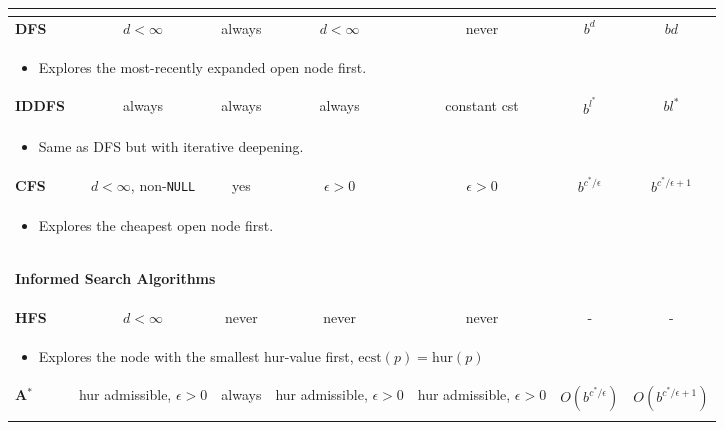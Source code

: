 \begin{summary}
\begin{center}
\begin{tabular}{lcccccc}
{\begin{itemize}
        \end{itemize}} \\
        \midrule
        \textbf{DFS} & $d<\infty$ & always & $d < \infty$ & never & $b^{d}$ & $bd$ \\
        \multicolumn{7}{p{\linewidth}}{
        \begin{itemize}
            \item Explores the most-recently expanded open node first.
        \end{itemize}} \\
        \midrule
        \textbf{IDDFS} & always & always & always & constant cst & $b^{l^{*}}$ & $bl^{*}$ \\
        \multicolumn{7}{p{\linewidth}}{
        \begin{itemize}
            \item Same as DFS but with iterative deepening.
        \end{itemize}} \\
        \midrule
        \textbf{CFS} & $d<\infty$, non-\texttt{NULL} & yes & $\epsilon >0$ & $\epsilon >0$ & $b^{c^{*} / \epsilon}$ & $b^{c^{*}/\epsilon + 1}$ \\
        \multicolumn{7}{p{\linewidth}}{
        \begin{itemize}
            \item Explores the cheapest open node first.
        \end{itemize}} \\
        \midrule
        \multicolumn{7}{p{\linewidth}}{
        \begin{center}
            \textbf{Informed Search Algorithms}
        \end{center}} \\
        \midrule
        \textbf{HFS} & $d<\infty$ & never & never & never & - & - \\
        \multicolumn{7}{p{\linewidth}}{
        \begin{itemize}
            \item Explores the node with the smallest hur-value first, $\text{ecst}(p) = \text{hur}(p)$
        \end{itemize}} \\
        \midrule
        \textbf{A$^*$} & hur admissible, $\epsilon > 0$ & always & hur admissible, $\epsilon > 0$ & hur admissible, $\epsilon > 0$ & $O\left(b^{c^{*}/\epsilon}\right)$ & $O\left(b^{c^{*}/\epsilon + 1}\right)$ \\
        \multicolumn{7}{p{\linewidth}}{
}
\end{tabular}
\end{center}
\end{summary}
